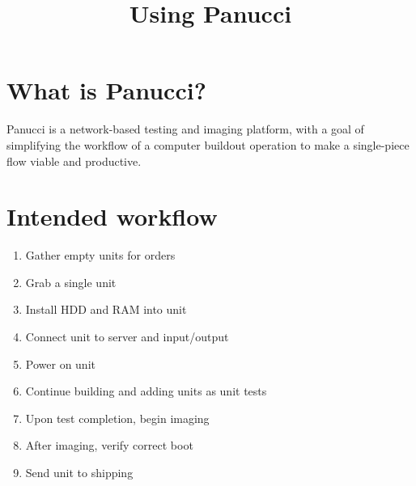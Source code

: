 \documentclass{article}
\begin{document}
\title{Using Panucci}
\maketitle
\begin{flushleft}
\section{What is Panucci?}
Panucci is a network-based testing and imaging platform, with a goal of simplifying the workflow of a computer buildout operation to make a single-piece flow viable and productive.
\pagebreak
\section{Intended workflow}
\begin{enumerate}
  \item Gather empty units for orders
  \item Grab a single unit
  \item Install HDD and RAM into unit
  \item Connect unit to server and input/output
  \item Power on unit
  \item Continue building and adding units as unit tests
  \item Upon test completion, begin imaging
  \item After imaging, verify correct boot
  \item Send unit to shipping
\end{enumerate}
\pagebreak

\end{flushleft}
\end{document}
